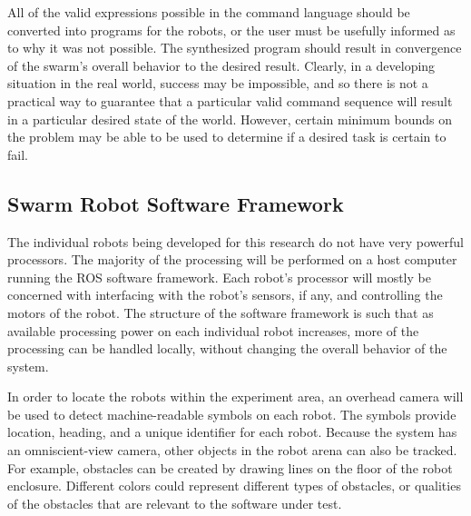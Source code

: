 \documentclass[]{article}
\begin{document}
All of the valid expressions possible in the command language should be converted into programs for the robots, or the user must be usefully informed as to why it was not possible. 
The synthesized program should result in convergence of the swarm's overall behavior to the desired result. 
Clearly, in a developing situation in the real world, success may be impossible, and so there is not a practical way to guarantee that a particular valid command sequence will result in a particular desired state of the world. 
However, certain minimum bounds on the problem may be able to be used to determine if a desired task is certain to fail. %

\subsection{Swarm Robot Software Framework}

The individual robots being developed for this research do not have very powerful processors. 
The majority of the processing will be performed on a host computer running the ROS software framework. 
Each robot's processor will mostly be concerned with interfacing with the robot's sensors, if any, and controlling the motors of the robot. 
The structure of the software framework is such that as available processing power on each individual robot increases, more of the processing can be handled locally, without changing the overall behavior of the system.

In order to locate the robots within the experiment area, an overhead camera will be used to detect machine-readable symbols on each robot. 
The symbols provide location, heading, and a unique identifier for each robot. 
Because the system has an omniscient-view camera, other objects in the robot arena can also be tracked. 
For example, obstacles can be created by drawing lines on the floor of the robot enclosure. 
Different colors could represent different types of obstacles, or qualities of the obstacles that are relevant to the software under test.
\end{document}
